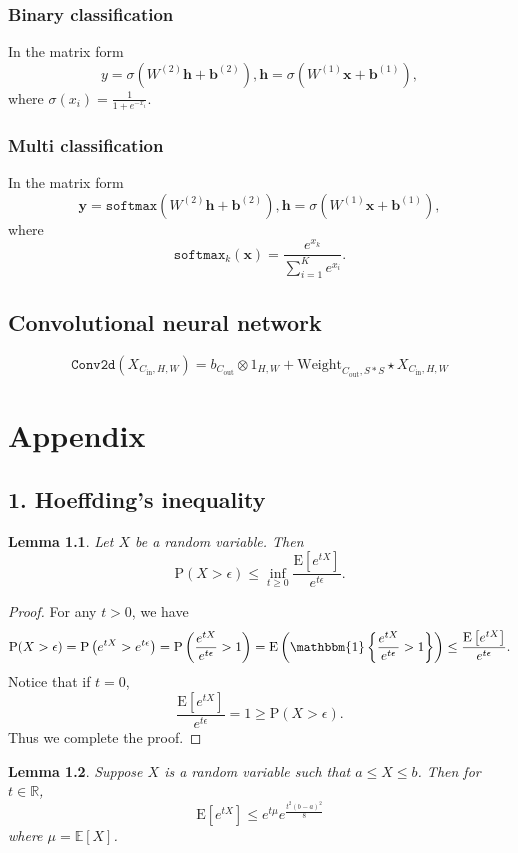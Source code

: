 \documentclass{report}
\newtheorem{lemma}{Lemma}[chapter]
\theoremstyle{nonumberplain}
\newtheorem{proof}{Proof.}
\newcommand{\0}{\mathbf{0}}
\begin{document}
\subsection{Binary classification}
In the matrix form
\[
y=\sigma(W^{(2)}\mathbf{h}+\mathbf{b}^{(2)}),\mathbf{h}=\sigma(W^{(1)}\mathbf{x}+\mathbf{b}^{(1)}),
\]
where $\sigma(x_i)=\frac{1}{1+e^{-x_i}}$.

\subsection{Multi classification}
In the matrix form
\[
\mathbf{y}=\mathtt{softmax}(W^{(2)}\mathbf{h}+\mathbf{b}^{(2)}),\mathbf{h}=\sigma(W^{(1)}\mathbf{x}+\mathbf{b}^{(1)}),
\]
where
\[
\mathtt{softmax}_k(\mathbf{x})=\frac{e^{x_k}}{\sum_{i=1}^{K}e^{x_i}}. 
\]

\section{Convolutional neural network}

\[
\mathtt{Conv2d}(X_{C_{\mathrm{in}},H,W})=b_{C_{\mathrm{out}}}\otimes 1_{H,W}+\mathrm{Weight}_{C_{\mathrm{out}},S*S}\star X_{C_{\mathrm{in}},H,W}
\]
\chapter*{Appendix}
\section*{1. Hoeffding's inequality} 
\begin{lemma}
	Let $X$ be a random variable. Then
	\[
	\mathrm{P}(X>\epsilon) \leq \inf _{t \geq 0} \frac{\mathrm{E}\left[e^{t X}\right]}{e^{t\epsilon}}.
	\]
\end{lemma}
\begin{proof}
	For any $t>0$, we have
	\[
	\mathrm{P}(X>\epsilon)
	=\mathrm{P}\left(e^{tX}>e^{t\epsilon}\right)
	=\mathrm{P}\left(\frac{e^{t X}}{e^{t\epsilon}}>1\right) =\mathrm{E}\left(\mathbbm{1}\left\{\frac{e^{t X}}{e^{t\epsilon}}>1\right\}\right)
	\leq\frac{\mathrm{E}\left[e^{t X}\right]}{e^{t\epsilon}}.
	\]
	Notice that if $t=0$, 
	\[
	\frac{\mathrm{E}\left[e^{t X}\right]}{e^{t\epsilon}}=1\ge\mathrm{P}(X>\epsilon). 
	\]
	Thus we complete the proof.
	
\end{proof}

\begin{lemma}
	Suppose $X$ is a random variable such that $a \leq X \leq b$. Then for $t\in\mathbb{R}$,
	\[
	\mathrm{E}\left[e^{t X}\right]\leq e^{t \mu} e^{\frac{t^{2}(b-a)^{2}}{8}}
	\]
	where $\mu=\mathbb{E}[X]$.
\end{lemma}
\end{document}
